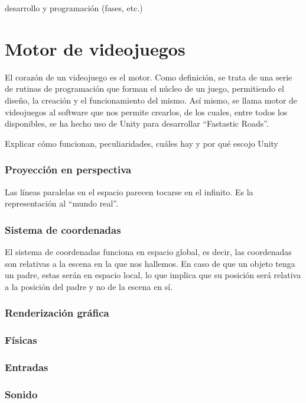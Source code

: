 desarrollo y programación (fases, etc.)

\section{Motor de videojuegos}

El corazón de un videojuego es el motor. Como definición, se trata de una serie de rutinas de programación que forman el núcleo de un juego, permitiendo el diseño, la creación y el funcionamiento del mismo. Así mismo, se llama motor de videojuegos al software que nos permite crearlos, de los cuales, entre todos los disponibles, se ha hecho uso de Unity para desarrollar ``Fastastic Roads''.

Explicar cómo funcionan, peculiaridades, cuáles hay y por qué escojo Unity

\subsubsection{Proyección en perspectiva}

Las líneas paralelas en el espacio parecen tocarse en el infinito. Es la representación al ``mundo real''.

\subsubsection{Sistema de coordenadas}

El sistema de coordenadas funciona en espacio global, es decir, las coordenadas son relativas a la escena en la que nos hallemos. En caso de que un objeto tenga un padre, estas serán en espacio local, lo que implica que su posición será relativa a la posición del padre y no de la escena en sí.

\subsubsection{Renderización gráfica}

\subsubsection{Físicas}

\subsubsection{Entradas}

\subsubsection{Sonido}

